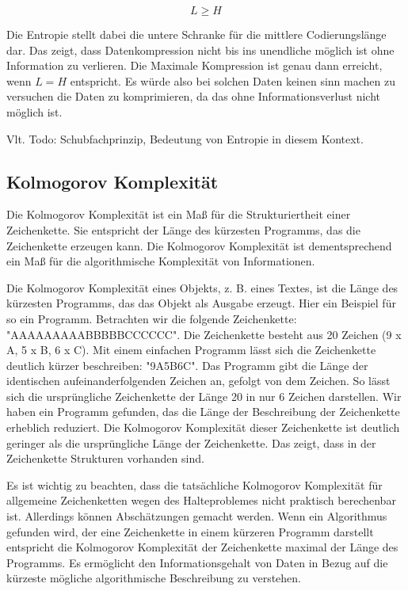 \documentclass[conference]{IEEEtran}
\begin{document}
\begin{equation}
    \label{eq:sct}
    L \ge H
\end{equation}

Die Entropie stellt dabei die untere Schranke für die mittlere Codierungslänge dar.
Das zeigt, dass Datenkompression nicht bis ins unendliche möglich ist ohne
Information zu verlieren.
Die Maximale Kompression ist genau dann erreicht, wenn $L = H$ entspricht.
Es würde also bei solchen Daten keinen sinn machen zu versuchen die Daten
zu komprimieren, da das ohne Informationsverlust nicht möglich ist.

Vlt. Todo: Schubfachprinzip, Bedeutung von Entropie in diesem Kontext.

\subsection{Kolmogorov Komplexität}

Die Kolmogorov Komplexität ist ein Maß für die Strukturiertheit einer Zeichenkette.
Sie entspricht der Länge des kürzesten Programms, das die Zeichenkette erzeugen
kann. \cite{li}
Die Kolmogorov Komplexität ist dementsprechend ein Maß für die algorithmische Komplexität
von Informationen.

Die Kolmogorov Komplexität eines Objekts, z. B. eines Textes, ist die Länge
des kürzesten Programms, das das Objekt als Ausgabe erzeugt.
Hier ein Beispiel für so ein Programm.
Betrachten wir die folgende Zeichenkette: "AAAAAAAAABBBBBCCCCCC".
Die Zeichenkette besteht aus 20 Zeichen (9 x A, 5 x B, 6 x C).
Mit einem einfachen Programm lässt sich die Zeichenkette deutlich kürzer
beschreiben: "9A5B6C".
Das Programm gibt die Länge der identischen aufeinanderfolgenden Zeichen an,
gefolgt von dem Zeichen.
So lässt sich die ursprüngliche Zeichenkette der Länge 20 in nur 6 Zeichen darstellen.
Wir haben ein Programm gefunden, das die Länge der Beschreibung der Zeichenkette
erheblich reduziert.
Die Kolmogorov Komplexität dieser Zeichenkette ist deutlich geringer als
die ursprüngliche Länge der Zeichenkette.
Das zeigt, dass in der Zeichenkette Strukturen vorhanden sind.

Es ist wichtig zu beachten, dass die tatsächliche Kolmogorov Komplexität für
allgemeine Zeichenketten wegen des Halteproblemes nicht praktisch
berechenbar ist. \cite{OPPaper}
Allerdings können Abschätzungen gemacht werden.
Wenn ein Algorithmus gefunden wird, der eine Zeichenkette in einem kürzeren
Programm darstellt entspricht die Kolmogorov Komplexität der Zeichenkette
maximal der Länge des Programms.
Es ermöglicht den Informationsgehalt von Daten in
Bezug auf die kürzeste mögliche algorithmische Beschreibung zu verstehen.
\end{document}
